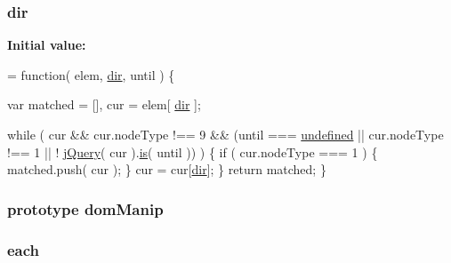 \hypertarget{jquery-1_810_82-vsdoc_8js_a49baab980d9b27347df35195d88ef25f}{
\subsubsection[{dir}]{ dir}}\label{jquery-1_810_82-vsdoc_8js_a49baab980d9b27347df35195d88ef25f}
{\bfseries Initial value\-:}
\begin{DoxyCode}
= \textcolor{keyword}{function}( elem, \hyperlink{jquery-1_810_82-vsdoc_8js_a49baab980d9b27347df35195d88ef25f}{dir}, until ) \{

        var matched = [],
            cur = elem[ \hyperlink{jquery-1_810_82-vsdoc_8js_a49baab980d9b27347df35195d88ef25f}{dir} ];

        \textcolor{keywordflow}{while} ( cur && cur.nodeType !== 9 && (until === \hyperlink{jquery-1_810_82-vsdoc_8js_a08113a236cc18d2a9d5ce27e638012be}{undefined} || cur.nodeType !== 1 || !
      \hyperlink{jquery-1_810_82-vsdoc_8js_add5237586d970a38a81f990e8eb28c6c}{jQuery}( cur ).\hyperlink{jquery-1_810_82-vsdoc_8js_ab09af0fb8923d70813f6d128591d1962}{is}( until )) ) \{
            \textcolor{keywordflow}{if} ( cur.nodeType === 1 ) \{
                matched.push( cur );
            \}
            cur = cur[\hyperlink{jquery-1_810_82-vsdoc_8js_a49baab980d9b27347df35195d88ef25f}{dir}];
        \}
        \textcolor{keywordflow}{return} matched;
    \}
\end{DoxyCode}
\hypertarget{jquery-1_810_82-vsdoc_8js_a00a63bd312ef048290dc1755ccb8bae4}{
\subsubsection[{dom\-Manip}]{ {\bf prototype} dom\-Manip}}\label{jquery-1_810_82-vsdoc_8js_a00a63bd312ef048290dc1755ccb8bae4}
\hypertarget{jquery-1_810_82-vsdoc_8js_aae0bcb6b00035445a8f9b262c96ea8a2}{
\subsubsection[{each}]{ each}}\label{jquery-1_810_82-vsdoc_8js_aae0bcb6b00035445a8f9b262c96ea8a2}
